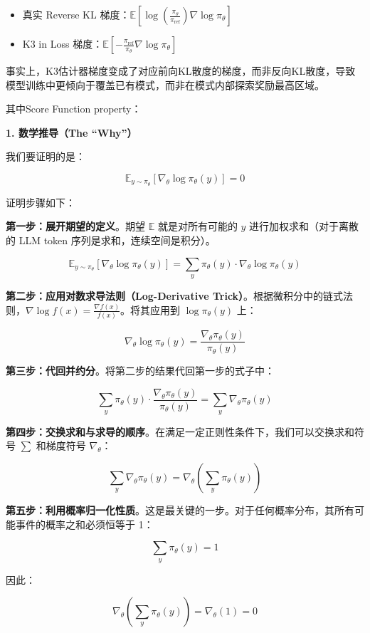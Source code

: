 \begin{itemize}
\tightlist
\item
  真实 Reverse KL 梯度：\(\mathbb{E}\left[\log\left(\frac{\pi_\theta}{\pi_{\mathrm{ref}}}\right)\nabla\log\pi_\theta\right]\)
\item
  K3 in Loss 梯度：\(\mathbb{E}\left[-\frac{\pi_{\mathrm{ref}}}{\pi_\theta}\nabla\log\pi_\theta\right]\)
\end{itemize}

事实上，K3估计器梯度变成了对应前向KL散度的梯度，而非反向KL散度，导致模型训练中更倾向于覆盖已有模式，而非在模式内部探索奖励最高区域。

其中Score Function property：

\textbf{1. 数学推导（The ``Why''）}

我们要证明的是：

\[
\mathbb{E}_{y\sim\pi_\theta}\left[\nabla_\theta\log\pi_\theta(y)\right]=0
\]

证明步骤如下：

\textbf{第一步：展开期望的定义}。期望 \(\mathbb{E}\) 就是对所有可能的 \(y\) 进行加权求和（对于离散的 LLM token 序列是求和，连续空间是积分）。

\[
\mathbb{E}_{y\sim\pi_\theta}\left[\nabla_\theta\log\pi_\theta(y)\right]
=\sum_y \pi_\theta(y)\cdot\nabla_\theta\log\pi_\theta(y)
\]

\textbf{第二步：应用对数求导法则（Log-Derivative Trick）}。根据微积分中的链式法则，\(\nabla\log f(x)=\frac{\nabla f(x)}{f(x)}\)。将其应用到 \(\log\pi_\theta(y)\) 上：

\[
\nabla_\theta\log\pi_\theta(y)
=\frac{\nabla_\theta\pi_\theta(y)}{\pi_\theta(y)}
\]

\textbf{第三步：代回并约分}。将第二步的结果代回第一步的式子中：

\[
\sum_y \pi_\theta(y)\cdot
\frac{\nabla_\theta\pi_\theta(y)}{\pi_\theta(y)}
=\sum_y \nabla_\theta\pi_\theta(y)
\]

\textbf{第四步：交换求和与求导的顺序}。在满足一定正则性条件下，我们可以交换求和符号 \(\sum\) 和梯度符号 \(\nabla_\theta\)：

\[
\sum_y \nabla_\theta\pi_\theta(y)
=\nabla_\theta\left(\sum_y \pi_\theta(y)\right)
\]

\textbf{第五步：利用概率归一化性质}。这是最关键的一步。对于任何概率分布，其所有可能事件的概率之和必须恒等于 1：

\[
\sum_y \pi_\theta(y)=1
\]

因此：

\[
\nabla_\theta\left(\sum_y \pi_\theta(y)\right)
=\nabla_\theta(1)=0
\]

